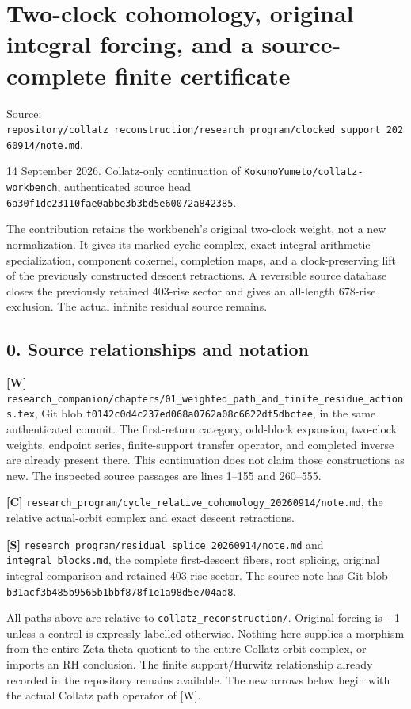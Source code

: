 \chapter{Two-clock cohomology, original integral forcing, and a
source-complete finite certificate}
{\small\sffamily Source: \nolinkurl{repository/collatz_reconstruction/research_program/clocked_support_20260914/note.md}.\par}


14 September 2026. Collatz-only continuation of
\nolinkurl{KokunoYumeto/collatz-workbench}, authenticated source head
\nolinkurl{6a30f1dc23110fae0abbe3b3bd5e60072a842385}.

The contribution retains the workbench's original two-clock weight, not
a new normalization. It gives its marked cyclic complex, exact
integral-arithmetic specialization, component cokernel, completion maps,
and a clock-preserving lift of the previously constructed descent
retractions. A reversible source database closes the previously retained
403-rise sector and gives an all-length 678-rise exclusion. The actual
infinite residual source remains.

\section{0. Source relationships and notation}

\textbf{{[}W{]}}
\nolinkurl{research_companion/chapters/01_weighted_path_and_finite_residue_actions.tex},
Git blob \nolinkurl{f0142c0d4c237ed068a0762a08c6622df5dbcfee}, in the
same authenticated commit. The first-return category, odd-block
expansion, two-clock weights, endpoint series, finite-support transfer
operator, and completed inverse are already present there. This
continuation does not claim those constructions as new. The inspected
source passages are lines 1--155 and 260--555.

\textbf{{[}C{]}}
\nolinkurl{research_program/cycle_relative_cohomology_20260914/note.md},
the relative actual-orbit complex and exact descent retractions.

\textbf{{[}S{]}}
\nolinkurl{research_program/residual_splice_20260914/note.md} and
\nolinkurl{integral_blocks.md}, the complete first-descent fibers, root
splicing, original integral comparison and retained 403-rise sector. The
source note has Git blob
\nolinkurl{b31acf3b485b9565b1bbf878f1e1a98d5e704ad8}.

All paths above are relative to \nolinkurl{collatz_reconstruction/}.
Original forcing is +1 unless a control is expressly labelled otherwise.
Nothing here supplies a morphism from the entire Zeta theta quotient to
the entire Collatz orbit complex, or imports an RH conclusion. The
finite support/Hurwitz relationship already recorded in the repository
remains available. The new arrows below begin with the actual Collatz
path operator of {[}W{]}.

